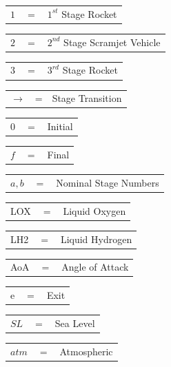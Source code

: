 \begin{tabular}{p{1.2cm}p{1cm}p{5cm}}
	$1$ & $=$ & $1^{st}$ Stage Rocket\\
\end{tabular} 
\begin{tabular}{p{1.2cm}p{1cm}p{5cm}}
	$2$ & $=$ & $2^{nd}$ Stage Scramjet Vehicle\\
\end{tabular} 
\begin{tabular}{p{1.2cm}p{1cm}p{5cm}}
	$3$ & $=$ & $3^{rd}$ Stage Rocket\\
\end{tabular} 
\begin{tabular}{p{1.2cm}p{1cm}p{5cm}}
	$\rightarrow$ & = & Stage Transition\\
\end{tabular} 
\begin{tabular}{p{1.2cm}p{1cm}p{5cm}}
	$0$ & $=$ & Initial\\
\end{tabular} 
\begin{tabular}{p{1.2cm}p{1cm}p{5cm}}
	$f$ & $=$ & Final\\
\end{tabular} 
\begin{tabular}{p{1.2cm}p{1cm}p{5cm}}
	$a,b$ & $=$ & Nominal Stage Numbers\\
\end{tabular} 
\begin{tabular}{p{1.2cm}p{1cm}p{5cm}}
	LOX & $=$ & Liquid Oxygen\\
\end{tabular} 
\begin{tabular}{p{1.2cm}p{1cm}p{5cm}}
	LH2 & $=$ & Liquid Hydrogen\\
	
\end{tabular} 
\begin{tabular}{p{1.2cm}p{1cm}p{5cm}}
	AoA & $=$ & Angle of Attack\\
	
\end{tabular} 
\begin{tabular}{p{1.2cm}p{1cm}p{5cm}}
	e & $=$ & Exit\\
\end{tabular} 
\begin{tabular}{p{1.2cm}p{1cm}p{5cm}}
	$SL$ & $=$ & Sea Level\\
\end{tabular} 
\begin{tabular}{p{1.2cm}p{1cm}p{5cm}}
	$atm$ & $=$ & Atmospheric\\
	
\end{tabular} 
